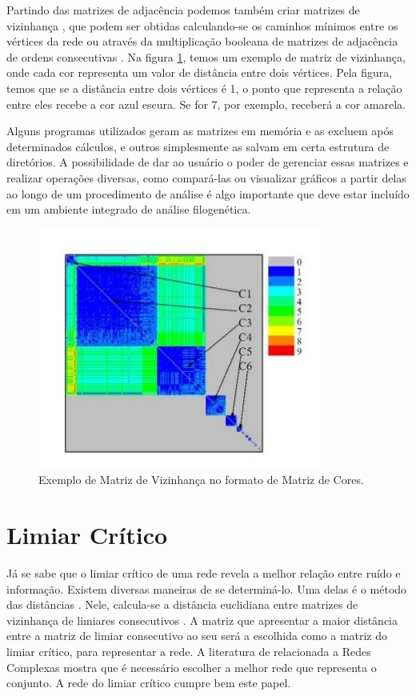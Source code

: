 Partindo das matrizes de adjacência podemos também criar matrizes de vizinhança \cite{andrade2009}, que podem ser obtidas calculando-se os caminhos mínimos
\cite{bessa2008} entre os vértices da rede ou através da multiplicação booleana de matrizes de adjacência de ordens consecutivas \cite{andrade2006}. Na figura 
\ref{fig:matriz-vizinhanca}, temos um exemplo de matriz de vizinhança, onde cada cor representa um valor de distância entre dois vértices. Pela figura, temos
que se a distância entre dois vértices é 1, o ponto que representa a relação entre eles recebe a cor azul escura. Se for 7, por exemplo, receberá a cor
amarela.

Alguns programas utilizados geram as matrizes em memória e as excluem após determinados cálculos, e outros simplesmente as salvam em certa estrutura
de diretórios. A possibilidade de dar ao usuário o poder de gerenciar essas matrizes e realizar operações diversas, como compará-las ou visualizar gráficos
a partir delas ao longo de um procedimento de análise é algo importante que deve estar incluído em um ambiente integrado de análise filogenética.

\begin{figure}
\centering
\includegraphics[scale=0.53]{matriz-vizinhanca}
\caption{Exemplo de Matriz de Vizinhança no formato de Matriz de Cores.}
\label{fig:matriz-vizinhanca}
\end{figure}

\section{Limiar Crítico} \label{sec:limcrit}

Já se sabe que o limiar crítico de uma rede revela a melhor relação entre ruído e informação. Existem diversas maneiras de se determiná-lo.
Uma delas é o método das distâncias \cite{andrade2011}. Nele, calcula-se a distância euclidiana entre matrizes de
vizinhança de limiares consecutivos \cite{andrade2008}. A matriz que apresentar a maior distância entre a matriz de limiar consecutivo
ao seu será a escolhida como a matriz do limiar crítico, para representar a rede. A literatura de relacionada a Redes Complexas mostra que é necessário
escolher a melhor rede que representa o conjunto.
A rede do limiar crítico cumpre bem este papel.

